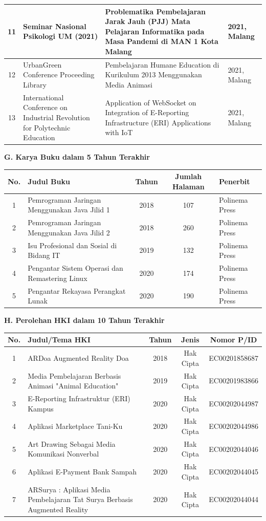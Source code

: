 {\begin{longtable}{|c|p{5cm}|p{5.5cm}|p{3.5cm}|}
\hline
11 & Seminar Nasional Psikologi UM (2021) & Problematika Pembelajaran Jarak Jauh (PJJ) Mata Pelajaran Informatika pada Masa Pandemi di MAN 1 Kota Malang & 2021, Malang \\
\hline
12 & UrbanGreen Conference Proceeding Library & Pembelajaran Humane Education di Kurikulum 2013 Menggunakan Media Animasi & 2021, Malang \\
\hline
13 & International Conference on Industrial Revolution for Polytechnic Education & Application of WebSocket on Integration of E-Reporting Infrastructure (ERI) Applications with IoT & 2021, Malang \\
\hline
\end{longtable}
}

\textbf{G. Karya Buku dalam 5 Tahun Terakhir}

{\footnotesize
\begin{longtable}{|c|p{7cm}|c|c|p{2.5cm}|}
\hline
\textbf{No.} & \textbf{Judul Buku} & \textbf{Tahun} & \textbf{Jumlah Halaman} & \textbf{Penerbit} \\
\hline
1 & Pemrograman Jaringan Menggunakan Java Jilid 1 & 2018 & 107 & Polinema Press \\
\hline
2 & Pemrograman Jaringan Menggunakan Java Jilid 2 & 2018 & 260 & Polinema Press \\
\hline
3 & Isu Profesional dan Sosial di Bidang IT & 2019 & 132 & Polinema Press \\
\hline
4 & Pengantar Sistem Operasi dan Remastering Linux & 2020 & 174 & Polinema Press \\
\hline
5 & Pengantar Rekayasa Perangkat Lunak & 2020 & 190 & Polinema Press \\
\hline
\end{longtable}
}

\textbf{H. Perolehan HKI dalam 10 Tahun Terakhir}

{\footnotesize
\begin{longtable}{|c|p{6cm}|c|c|c|}
\hline
\textbf{No.} & \textbf{Judul/Tema HKI} & \textbf{Tahun} & \textbf{Jenis} & \textbf{Nomor P/ID} \\
\hline
1 & ARDoa Augmented Reality Doa & 2018 & Hak Cipta & EC00201858687 \\
\hline
2 & Media Pembelajaran Berbasis Animasi "Animal Education" & 2019 & Hak Cipta & EC00201983866 \\
\hline
3 & E-Reporting Infrastruktur (ERI) Kampus & 2020 & Hak Cipta & EC00202044987 \\
\hline
4 & Aplikasi Marketplace Tani-Ku & 2020 & Hak Cipta & EC00202044986 \\
\hline
5 & Art Drawing Sebagai Media Komunikasi Nonverbal & 2020 & Hak Cipta & EC00202044046 \\
\hline
6 & Aplikasi E-Payment Bank Sampah & 2020 & Hak Cipta & EC00202044045 \\
\hline
7 & ARSurya : Aplikasi Media Pembelajaran Tat Surya Berbasis Augmented Reality & 2020 & Hak Cipta & EC00202044044 \\
\hline
\end{longtable}
}

